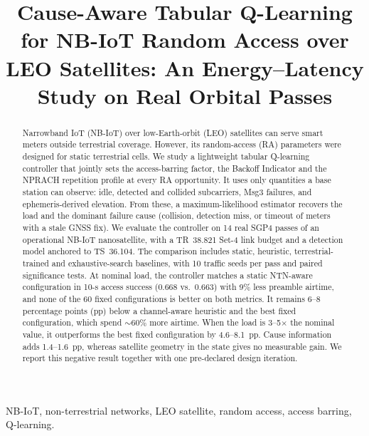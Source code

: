 \documentclass[conference]{IEEEtran}
\begin{document}
\title{Cause-Aware Tabular Q-Learning for NB-IoT Random Access over LEO Satellites: An Energy--Latency Study on Real Orbital Passes}

\author{
}

\maketitle

\begin{abstract}
Narrowband IoT (NB-IoT) over low-Earth-orbit (LEO) satellites can serve smart meters outside terrestrial coverage. However, its random-access (RA) parameters were designed for static terrestrial cells. We study a lightweight tabular Q-learning controller that jointly sets the access-barring factor, the Backoff Indicator and the NPRACH repetition profile at every RA opportunity. It uses only quantities a base station can observe: idle, detected and collided subcarriers, Msg3 failures, and ephemeris-derived elevation. From these, a maximum-likelihood estimator recovers the load and the dominant failure cause (collision, detection miss, or timeout of meters with a stale GNSS fix). We evaluate the controller on 14 real SGP4 passes of an operational NB-IoT nanosatellite, with a TR~38.821 Set-4 link budget and a detection model anchored to TS~36.104. The comparison includes static, heuristic, terrestrial-trained and exhaustive-search baselines, with 10 traffic seeds per pass and paired significance tests. At nominal load, the controller matches a static NTN-aware configuration in 10-s access success (0.668 vs.\ 0.663) with 9\% less preamble airtime, and none of the 60 fixed configurations is better on both metrics. It remains 6--8 percentage points (pp) below a channel-aware heuristic and the best fixed configuration, which spend ${\sim}60\%$ more airtime. When the load is 3--5$\times$ the nominal value, it outperforms the best fixed configuration by 4.6--8.1~pp. Cause information adds 1.4--1.6~pp, whereas satellite geometry in the state gives no measurable gain. We report this negative result together with one pre-declared design iteration.
\end{abstract}

\begin{IEEEkeywords}
NB-IoT, non-terrestrial networks, LEO satellite, random access, access barring, Q-learning.
\end{IEEEkeywords}
\end{document}
